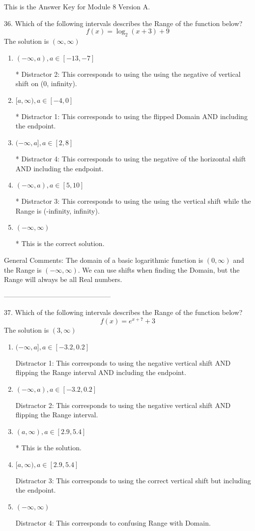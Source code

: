 \documentclass{article}[10pt]
\begin{document}
This is the Answer Key for Module 8 Version A.

36. Which of the following intervals describes the Range of the function below?
$$ f(x) = \log_2{(x+3)}+9 $$ 
The solution is $ (\infty, \infty) $ 

\begin{enumerate}[label=\Alph*.] 
\item $ (-\infty, a), a \in [-13, -7] $ 

 * Distractor 2: This corresponds to using the using the negative of vertical shift on (0, infinity). 
\item $ [a, \infty), a \in [-4, 0] $ 

 * Distractor 1: This corresponds to using the flipped Domain AND including the endpoint. 
\item $ (-\infty, a], a \in [2, 8] $ 

 * Distractor 4: This corresponds to using the negative of the horizontal shift AND including the endpoint. 
\item $ (-\infty, a), a \in [5, 10] $ 

 * Distractor 3: This corresponds to using the using the vertical shift while the Range is (-infinity, infinity). 
\item $ (-\infty, \infty) $ 

  * This is the correct solution. 
\end{enumerate} 
 
General Comments: The domain of a basic logarithmic function is $(0, \infty)$ and the Range is $(-\infty, \infty)$. We can use shifts when finding the Domain, but the Range will always be all Real numbers.

-----------------------------------------------

37. Which of the following intervals describes the Range of the function below?
$$ f(x) = e^{x+7}+3 $$ 
The solution is $ (3, \infty) $ 

\begin{enumerate}[label=\Alph*.] 
\item $ (-\infty, a], a \in [-3.2, 0.2] $ 

  Distractor 1: This corresponds to using the negative vertical shift AND flipping the Range interval AND including the endpoint. 
\item $ (-\infty, a), a \in [-3.2, 0.2] $ 

  Distractor 2: This corresponds to using the negative vertical shift AND flipping the Range interval. 
\item $ (a, \infty), a \in [2.9, 5.4] $ 

 * This is the solution. 
\item $ [a, \infty), a \in [2.9, 5.4] $ 

  Distractor 3: This corresponds to using the correct vertical shift but including the endpoint. 
\item $ (-\infty, \infty) $ 

 Distractor 4: This corresponds to confusing Range with Domain. 
\end{enumerate} 
 
\end{document}
